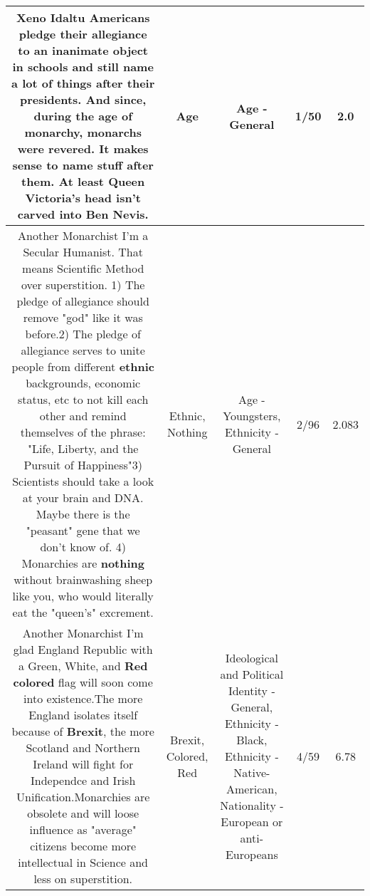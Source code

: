 \documentclass[11pt]{article}
\newlength\mylength
\begin{document}
\begin{center}
\begin{longtable}{|C{.65\mylength}|C{.30\mylength}|C{.12\mylength}|C{.12\mylength}|C{.12\mylength}|}
  \small Xeno Idaltu Americans pledge their allegiance to an inanimate object in schools and still name a lot of things after their presidents. And since, during the \textbf{age} of monarchy, monarchs were revered. It makes sense to name stuff after them. At least Queen Victoria's head isn't carved into Ben Nevis.\normalsize   & Age & Age - General & 1/50 & 2.0 \\  \hline
  \small Another Monarchist I'm a Secular Humanist. That means Scientific Method over superstition. 1) The pledge of allegiance should remove "god" like it was before.2) The pledge of allegiance serves to  unite people from different \textbf{ethnic} backgrounds, economic status, etc to not kill each other and remind themselves of the phrase: "Life, Liberty, and the Pursuit of Happiness"3) Scientists should take a look at your brain and DNA. Maybe there is the "peasant" gene that we don't know of. 4) Monarchies are \textbf{nothing} without brainwashing sheep like you, who would literally eat the "queen's" excrement.\normalsize   & Ethnic, Nothing & Age - Youngsters, Ethnicity - General & 2/96 & 2.083 \\  \hline
  \small Another Monarchist I'm glad England Republic with a Green, White, and \textbf{R\textbf{ed}} \textbf{colored} flag will soon come into existence.The more England isolates itself because of \textbf{Brexit}, the more Scotland and Northern Ireland will fight for Independce and Irish Unification.Monarchies are obsolete and will loose influence as "average" citizens become more intellectual in Science and less on superstition.\normalsize   & Brexit, Colored, Red &  Ideological and Political Identity - General, Ethnicity - Black, Ethnicity - Native-American, Nationality - European or anti-Europeans & 4/59 & 6.78 \\  \hline

\end{longtable}
\end{center}
\end{document}
